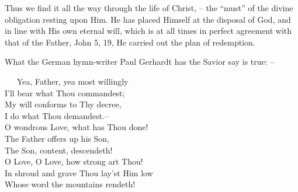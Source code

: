 \documentclass[
]{book}
\begin{document}
Thus we find it all the way through the life of Christ, -- the ``must'' of the divine obligation resting upon Him. He has placed Himself at the disposal of God, and in line with His own eternal will, which is at all times in perfect agreement with that of the Father, John 5, 19, He carried out the plan of redemption.

What the German hymn-writer Paul Gerhardt has the Savior say is true: --

~~~Yea, Father, yea most willingly\\
\hspace*{0.333em}\hspace*{0.333em}\hspace*{0.333em}I'll bear what Thou commandest;\\
\hspace*{0.333em}\hspace*{0.333em}\hspace*{0.333em}My will conforms to Thy decree,\\
\hspace*{0.333em}\hspace*{0.333em}\hspace*{0.333em}I do what Thou demandest.--\\
\hspace*{0.333em}\hspace*{0.333em}\hspace*{0.333em}O wondrous Love, what has Thou done!\\
\hspace*{0.333em}\hspace*{0.333em}\hspace*{0.333em}The Father offers up his Son,\\
\hspace*{0.333em}\hspace*{0.333em}\hspace*{0.333em}The Son, content, descendeth!\\
\hspace*{0.333em}\hspace*{0.333em}\hspace*{0.333em}O Love, O Love, how strong art Thou!\\
\hspace*{0.333em}\hspace*{0.333em}\hspace*{0.333em}In shroud and grave Thou lay'st Him low\\
\hspace*{0.333em}\hspace*{0.333em}\hspace*{0.333em}Whose word the mountains rendeth!
\end{document}
